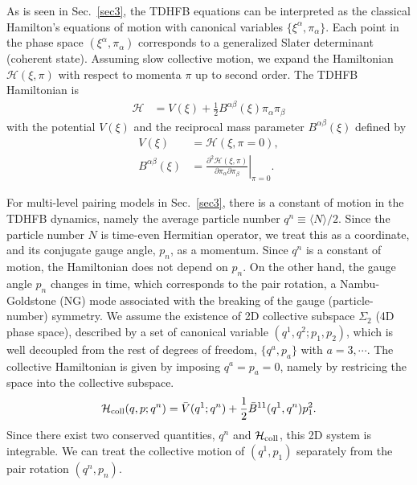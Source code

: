 \documentclass[%
superscriptaddress,
showpacs,
nofootinbib,
amsmath,amssymb,
aps,
prc,
twocolumn,
floatfix ]%
{revtex4-1}
\begin{document}
As is seen in Sec.~\ref{sec3}, the TDHFB equations can be
interpreted as the classical Hamilton's equations of motion
with canonical variables $\{\xi^{\alpha},\pi_{\alpha}\}$. 
Each point in the phase space $(\xi^{\alpha},\pi_{\alpha})$
corresponds to a generalized Slater determinant (coherent state).
Assuming slow collective motion,
we expand the Hamiltonian $\mathcal{H}(\xi,\pi)$ with respect to
momenta $\pi$ up to second order.
The TDHFB Hamiltonian is
\begin{align}
 \mathcal{H} &= V(\xi) + \frac{1}{2}B^{\alpha\beta}(\xi)\pi_{\alpha}\pi_{\beta}
\end{align}
with the potential $V(\xi)$ and
the reciprocal mass parameter $B^{\alpha\beta}(\xi)$ defined by
\begin{align}
  V(\xi) &= \mathcal{H}(\xi,\pi=0) , \\
  B^{\alpha\beta}(\xi) &= \left. \frac{\partial^2\mathcal{H}(\xi,\pi)}{\partial\pi_{\alpha}\partial\pi_{\beta}} \right|_{\pi=0}.
\end{align}

For multi-level pairing models in Sec.~\ref{sec3}, 
there is a constant of motion in the TDHFB dynamics,
namely the average particle number $q^n\equiv \langle N \rangle/2$.
Since the particle number $N$ is time-even Hermitian operator, we treat
this as a coordinate, and its conjugate gauge angle, $p_n$,
as a momentum.
Since $q^n$ is a constant of motion, the Hamiltonian does not
depend on $p_n$.
On the other hand, the gauge angle $p_n$ changes in time,
which corresponds to the pair rotation, a Nambu-Goldstone (NG) mode
associated with the breaking of the gauge (particle-number) symmetry.
We assume the existence of 2D collective subspace $\Sigma_2$
(4D phase space),
described by a set of canonical variable $(q^1,q^2;p_1,p_2)$,
which is well decoupled from the rest of degrees of freedom,
$\{q^a,p_a\}$ with $a=3,\cdots$.
The collective Hamiltonian is given by imposing $q^a=p_a=0$,
namely by restricing the space into the collective subspace.
\begin{equation}
\mathcal{H}_{\rm coll}(q,p;q^n)
= \bar{V}(q^1;q^n) + \frac{1}{2}\bar{B}^{11}(q^1,q^n)p_1^2 .
  \label{coll}
\end{equation}
Since there exist two conserved quantities, $q^n$ and $\mathcal{H}_{\rm coll}$,
this 2D system is integrable.
We can treat the collective motion of $(q^1,p_1)$ separately from
the pair rotation $(q^n, p_n)$.
\end{document}
